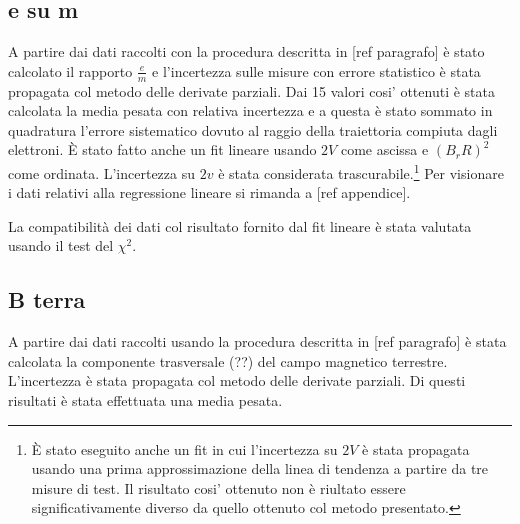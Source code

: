 \subsection{e su m}
A partire dai dati raccolti con la procedura descritta in [ref paragrafo] è stato calcolato il rapporto $\frac{e}{m}$ e l'incertezza sulle misure con errore statistico è stata propagata col metodo delle derivate parziali. Dai 15 valori cosi' ottenuti è stata calcolata la media pesata con relativa incertezza e a questa è stato sommato in quadratura l'errore sistematico dovuto al raggio della traiettoria compiuta dagli elettroni. 
È stato fatto anche un fit lineare usando $2V$ come ascissa e $(B_rR)^2$ come ordinata. L'incertezza su $2v$ è stata considerata trascurabile.\footnote{È stato eseguito anche un fit in cui l'incertezza su $2V$ è stata propagata usando una prima approssimazione della linea di tendenza a partire da tre misure di test. Il risultato cosi' ottenuto non è riultato essere significativamente diverso da quello ottenuto col metodo presentato.}
Per visionare i dati relativi alla regressione lineare si rimanda a [ref appendice].

La compatibilità dei dati col risultato fornito dal fit lineare è stata valutata usando il test del $\chi^2$.

\subsection{B terra}
A partire dai  dati raccolti usando la procedura descritta in [ref paragrafo] è stata calcolata la componente trasversale (??) del campo magnetico terrestre. L'incertezza è stata propagata col metodo delle derivate parziali. Di questi risultati è stata effettuata una media pesata.


